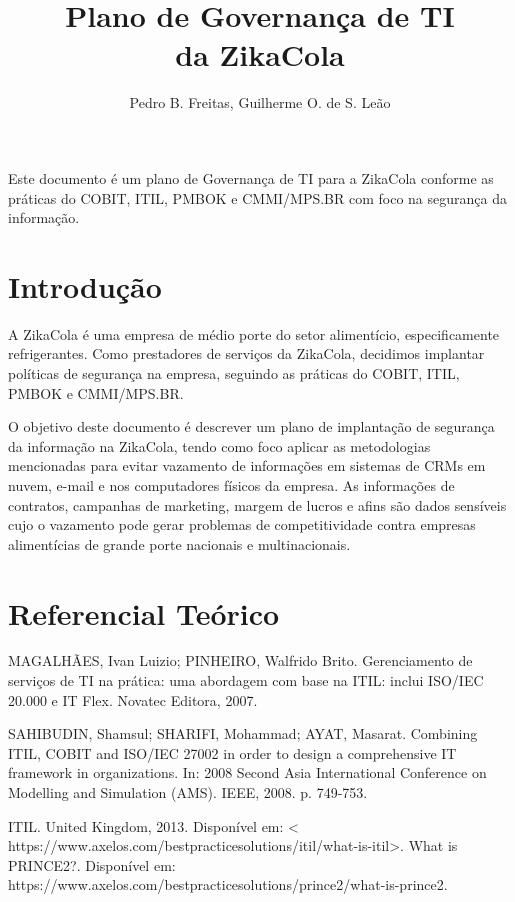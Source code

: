 \documentclass[12pt]{article}
\title{Plano de Governança de TI\\ da ZikaCola}
\author{Pedro B. Freitas\inst, Guilherme O. de S. Leão\inst}
\begin{document}
 

\maketitle
     
\begin{Resumo} 
Este documento é um plano de Governança de TI para a ZikaCola conforme as práticas do COBIT, ITIL, PMBOK e CMMI/MPS.BR com foco na segurança da informação.
\end{Resumo}


\section{Introdução}

A ZikaCola é uma empresa de médio porte do setor alimentício, especificamente refrigerantes. Como prestadores de serviços da ZikaCola, decidimos implantar políticas de segurança na empresa, seguindo as práticas do COBIT, ITIL, PMBOK e CMMI/MPS.BR.

O objetivo deste documento é descrever um plano de implantação de segurança da informação na ZikaCola, tendo como foco aplicar as metodologias mencionadas para evitar vazamento de informações em sistemas de CRMs em nuvem, e-mail e nos computadores físicos da empresa. As informações de contratos, campanhas de marketing, margem de lucros e afins são dados sensíveis cujo o vazamento pode gerar problemas de competitividade contra empresas alimentícias de grande porte nacionais e multinacionais.  


\section{Referencial Teórico} 

MAGALHÃES, Ivan Luizio; PINHEIRO, Walfrido Brito. Gerenciamento de
serviços de TI na prática: uma abordagem com base na ITIL: inclui
ISO/IEC 20.000 e IT Flex. Novatec Editora, 2007.

SAHIBUDIN, Shamsul; SHARIFI, Mohammad; AYAT, Masarat. Combining
ITIL, COBIT and ISO/IEC 27002 in order to design a comprehensive IT
framework in organizations. In: 2008 Second Asia International
Conference on Modelling and Simulation (AMS). IEEE, 2008. p. 749-753.

ITIL. United Kingdom, 2013. Disponível em: < https://www.axelos.com/bestpracticesolutions/itil/what-is-itil>. What is PRINCE2?. Disponível em: https://www.axelos.com/bestpracticesolutions/prince2/what-is-prince2.
\end{document}
